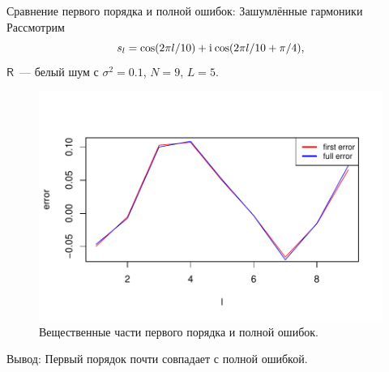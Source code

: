 \documentclass[ucs, notheorems, handout]{beamer}
\newcommand{\tX}[1]{\mathsf{#1}}
\newcommand{\iu}{\mathrm{i}\mkern1mu}
\begin{document}

\begin{frame}{Сравнение первого порядка и полной ошибок: Зашумлённые гармоники}
Рассмотрим
$$s_l = \cos(2 \pi l / 10) + \iu\cos(2 \pi l / 10 + \pi/4),$$
$\tX{R}$~--- белый шум с $\sigma^2 = 0.1$, $N = 9$, $L = 5$.
\begin{figure}[H]
	\begin{center}
		\includegraphics[width=0.6\linewidth]{img/first_vs_full_re.pdf}
		\caption{Вещественные части первого порядка и полной ошибок.}
		\label{fig:harm_noise}
	\end{center}
\end{figure}
\alert{Вывод:} Первый порядок почти совпадает с полной ошибкой.
\end{frame}
\end{document}
